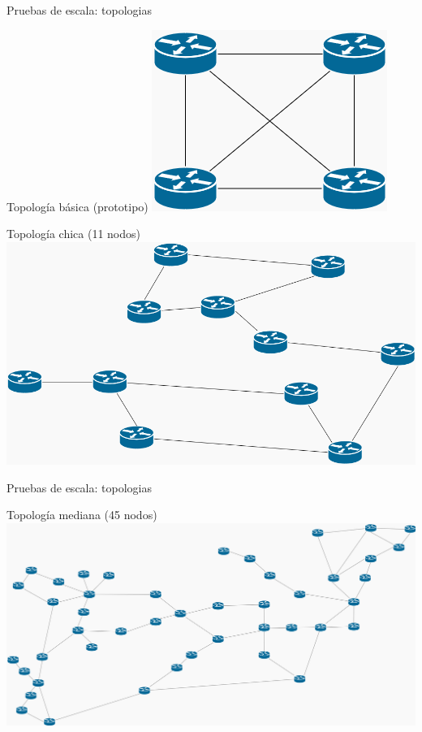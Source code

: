 \documentclass[xcolor=svgnames]{beamer}
\begin{document}
\begin{frame}{Pruebas de escala: topologias}
	\begin{minipage}[b]{0.3\textwidth}
		\begin{center}
			Topología básica (prototipo)
			\includegraphics[scale=0.4]{basic_topology}
		\end{center}
	\end{minipage}
	\hfill
	\begin{minipage}[b]{0.6\textwidth}
		\begin{center}
			Topología chica (11 nodos)
			\includegraphics[scale=0.25]{small_topology}
		\end{center}
	\end{minipage}
\end{frame}

\begin{frame}{Pruebas de escala: topologias}
	\begin{center}
		Topología mediana (45 nodos)
		\includegraphics[scale=0.15]{medium_topology}
	\end{center}
\end{frame}
\end{document}
